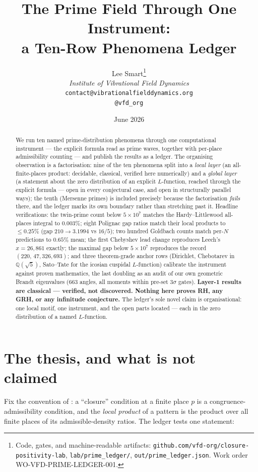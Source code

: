 \documentclass[11pt]{article}
\title{The Prime Field Through One Instrument:\\
a Ten-Row Phenomena Ledger}
\author{%
  Lee Smart\thanks{Code, gates, and machine-readable artifacts:
\texttt{github.com/vfd-org/closure-positivity-lab},
\texttt{lab/prime\_ledger/}, \texttt{out/prime\_ledger.json}.
Work order WO-VFD-PRIME-LEDGER-001.}\\[4pt]
  \textit{Institute of Vibrational Field Dynamics}\\[2pt]
  \texttt{contact@vibrationalfielddynamics.org}\\[2pt]
  \texttt{@vfd\_org}%
}
\date{June 2026}
\newcommand{\KK}{\mathbb{Q}(\sqrt5)}
\theoremstyle{remark}
\begin{document}
\maketitle

\begin{abstract}\noindent
We run ten named prime-distribution phenomena through one computational
instrument --- the explicit formula read as prime waves, together with
per-place admissibility counting --- and publish the results as a ledger.
The organising observation is a factorisation: nine of the ten phenomena
split into a \emph{local layer} (an all-finite-places product: decidable,
classical, verified here numerically) and a \emph{global layer} (a statement
about the zero distribution of an explicit $L$-function, reached through the
explicit formula --- open in every conjectural case, and open in structurally
parallel ways); the tenth (Mersenne primes) is included precisely because the
factorisation \emph{fails} there, and the ledger marks its own boundary
rather than stretching past it. Headline
verifications: the twin-prime count below $5\times10^7$ matches the
Hardy--Littlewood all-places integral to $0.003\%$; eight Polignac gap ratios
match their local products to $\le 0.25\%$ (gap $210\to 3.1994$ vs $16/5$);
two hundred Goldbach counts match per-$N$ predictions to $0.65\%$ mean; the
first Chebyshev lead change reproduces Leech's $x=26{,}861$ exactly; the
maximal gap below $5\times10^7$ reproduces the record $(220,\,47{,}326{,}693)$;
and three theorem-grade anchor rows (Dirichlet, Chebotarev in $\KK$,
Sato--Tate for the icosian cuspidal $L$-function) calibrate the instrument
against proven mathematics, the last doubling as an audit of our own geometric
Brandt eigenvalues ($663$ angles, all moments within pre-set $3\sigma$ gates).
\textbf{Layer-1 results are classical --- verified, not discovered. Nothing
here proves RH, any GRH, or any infinitude conjecture.} The ledger's sole
novel claim is organisational: one local motif, one instrument, and the open
parts located --- each in the zero distribution of a named $L$-function.
\end{abstract}

\section{The thesis, and what is not claimed}

Fix the convention of \cite{Flagship,Diffraction}: a ``closure'' condition at
a finite place $p$ is a congruence-admissibility condition, and the
\emph{local product} of a pattern is the product over all finite places of its
admissible-density ratios. The ledger tests one statement:
\end{document}

